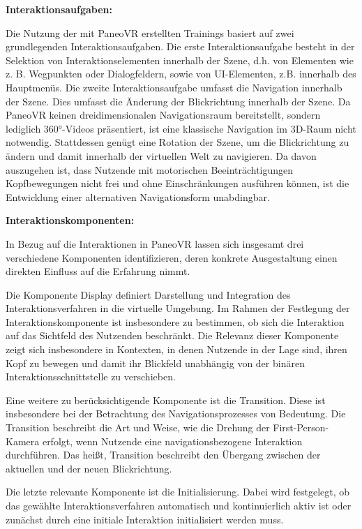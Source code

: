 {\normalfont \bfseries Interaktionsaufgaben:}  

Die Nutzung der mit PaneoVR erstellten Trainings basiert auf zwei grundlegenden Interaktionsaufgaben. Die erste Interaktionsaufgabe besteht in der Selektion von Interaktionselementen innerhalb der Szene, d.h. von Elementen wie z. B.  Wegpunkten oder Dialogfeldern, sowie von UI-Elementen, z.B. innerhalb des Hauptmenüs. Die zweite Interaktionsaufgabe umfasst die Navigation innerhalb der Szene. Dies umfasst die Änderung der Blickrichtung innerhalb der Szene. Da PaneoVR keinen dreidimensionalen Navigationsraum bereitstellt, sondern lediglich 360°-Videos präsentiert, ist eine klassische Navigation im 3D-Raum nicht notwendig. Stattdessen genügt eine Rotation der Szene, um die Blickrichtung zu ändern und damit innerhalb der virtuellen Welt zu navigieren. Da davon auszugehen ist, dass Nutzende mit motorischen Beeinträchtigungen Kopfbewegungen nicht frei und ohne Einschränkungen ausführen können, ist die Entwicklung einer alternativen Navigationsform unabdingbar. 

{\normalfont \bfseries Interaktionskomponenten:} 

In Bezug auf die Interaktionen in PaneoVR lassen sich insgesamt drei verschiedene Komponenten identifizieren, deren konkrete Ausgestaltung einen direkten Einfluss auf die Erfahrung nimmt. 

Die Komponente Display definiert Darstellung und Integration des Interaktionsverfahren in die virtuelle Umgebung. Im Rahmen der Festlegung der Interaktionskomponente ist insbesondere zu bestimmen, ob sich die Interaktion auf das Sichtfeld des Nutzenden beschränkt. Die Relevanz dieser Komponente zeigt sich insbesondere in Kontexten, in denen Nutzende in der Lage sind, ihren Kopf zu bewegen und damit ihr Blickfeld unabhängig von der binären Interaktionsschnittstelle zu verschieben.

Eine weitere zu berücksichtigende Komponente ist die Transition. Diese ist insbesondere bei der Betrachtung des Navigationsprozesses von Bedeutung. Die Transition beschreibt die Art und Weise, wie die Drehung der First-Person-Kamera erfolgt, wenn Nutzende eine navigationsbezogene Interaktion durchführen. Das heißt, Transition beschreibt den Übergang zwischen der aktuellen und der neuen Blickrichtung.

Die letzte relevante Komponente ist die Initialisierung. Dabei wird festgelegt, ob das gewählte Interaktionsverfahren automatisch und kontinuierlich aktiv ist oder zunächst durch eine initiale Interaktion initialisiert werden muss. 

